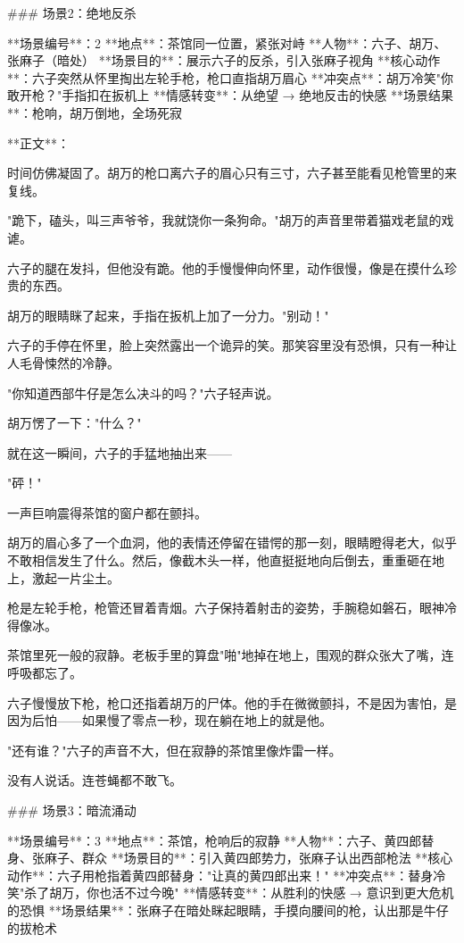 ### 场景2：绝地反杀

**场景编号**：2  
**地点**：茶馆同一位置，紧张对峙  
**人物**：六子、胡万、张麻子（暗处）  
**场景目的**：展示六子的反杀，引入张麻子视角  
**核心动作**：六子突然从怀里掏出左轮手枪，枪口直指胡万眉心  
**冲突点**：胡万冷笑"你敢开枪？"手指扣在扳机上  
**情感转变**：从绝望 → 绝地反击的快感  
**场景结果**：枪响，胡万倒地，全场死寂

**正文**：

时间仿佛凝固了。胡万的枪口离六子的眉心只有三寸，六子甚至能看见枪管里的来复线。

"跪下，磕头，叫三声爷爷，我就饶你一条狗命。"胡万的声音里带着猫戏老鼠的戏谑。

六子的腿在发抖，但他没有跪。他的手慢慢伸向怀里，动作很慢，像是在摸什么珍贵的东西。

胡万的眼睛眯了起来，手指在扳机上加了一分力。"别动！"

六子的手停在怀里，脸上突然露出一个诡异的笑。那笑容里没有恐惧，只有一种让人毛骨悚然的冷静。

"你知道西部牛仔是怎么决斗的吗？"六子轻声说。

胡万愣了一下："什么？"

就在这一瞬间，六子的手猛地抽出来——

"砰！"

一声巨响震得茶馆的窗户都在颤抖。

胡万的眉心多了一个血洞，他的表情还停留在错愕的那一刻，眼睛瞪得老大，似乎不敢相信发生了什么。然后，像截木头一样，他直挺挺地向后倒去，重重砸在地上，激起一片尘土。

枪是左轮手枪，枪管还冒着青烟。六子保持着射击的姿势，手腕稳如磐石，眼神冷得像冰。

茶馆里死一般的寂静。老板手里的算盘"啪"地掉在地上，围观的群众张大了嘴，连呼吸都忘了。

六子慢慢放下枪，枪口还指着胡万的尸体。他的手在微微颤抖，不是因为害怕，是因为后怕——如果慢了零点一秒，现在躺在地上的就是他。

"还有谁？"六子的声音不大，但在寂静的茶馆里像炸雷一样。

没有人说话。连苍蝇都不敢飞。

### 场景3：暗流涌动

**场景编号**：3  
**地点**：茶馆，枪响后的寂静  
**人物**：六子、黄四郎替身、张麻子、群众  
**场景目的**：引入黄四郎势力，张麻子认出西部枪法  
**核心动作**：六子用枪指着黄四郎替身："让真的黄四郎出来！"  
**冲突点**：替身冷笑"杀了胡万，你也活不过今晚"  
**情感转变**：从胜利的快感 → 意识到更大危机的恐惧  
**场景结果**：张麻子在暗处眯起眼睛，手摸向腰间的枪，认出那是牛仔的拔枪术

